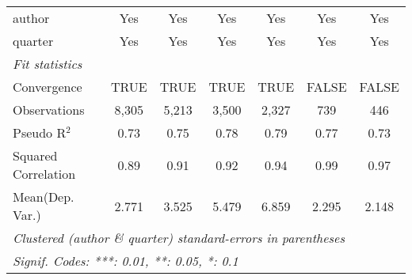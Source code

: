 \begin{tabular}{lcccccc}
   author                                                     & Yes           & Yes           & Yes           & Yes          & Yes           & Yes\\  
   quarter                                                    & Yes           & Yes           & Yes           & Yes          & Yes           & Yes\\  
   \midrule
   \emph{Fit statistics}\\
   Convergence                                                &TRUE           & TRUE          & TRUE          & TRUE         & FALSE         & FALSE\\  
   Observations                                               & 8,305         & 5,213         & 3,500         & 2,327        & 739           & 446\\  
   Pseudo R$^2$                                               & 0.73          & 0.75          & 0.78          & 0.79         & 0.77          & 0.73\\  
   Squared Correlation                                        & 0.89          & 0.91          & 0.92          & 0.94         & 0.99          & 0.97\\  
Mean(Dep. Var.) & 2.771 & 3.525 & 5.479 & 6.859 & 2.295 & 2.148 \\
   \midrule \midrule
   \multicolumn{7}{l}{\emph{Clustered (author \& quarter) standard-errors in parentheses}}\\
   \multicolumn{7}{l}{\emph{Signif. Codes: ***: 0.01, **: 0.05, *: 0.1}}\\
\end{tabular}
\par\endgroup
